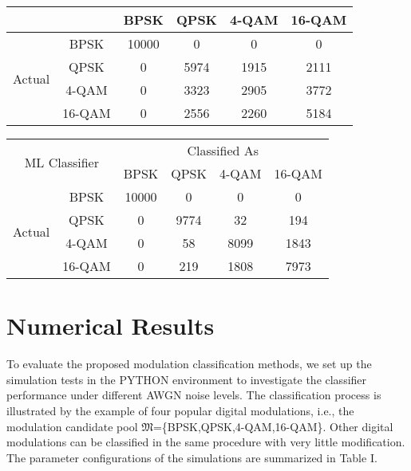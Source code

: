 \documentclass[conference]{IEEEtran}
\begin{document}
\begin{table}[h]
\begin{tabular}{|c|c|c|c|c|c|}
\multicolumn{2}{|c|}{}                                     & BPSK  & QPSK & 4-QAM & 16-QAM \\ \hline
\multirow{4}{*}{Actual}             & BPSK              & 10000 & 0    & 0     & 0      \\ \cline{2-6}
                                       & QPSK              & 0     & 5974 & 1915  & 2111   \\ \cline{2-6}
                                       & 4-QAM             & 0     & 3323 & 2905  & 3772   \\ \cline{2-6}
                                       & 16-QAM            & 0     & 2556 & 2260  & 5184   \\ \hline
\end{tabular}
\vspace{1pt}
\vspace{1pt}

\begin{tabular}{|c|c|c|c|c|c|}
\hline
\multicolumn{2}{|c|}{\multirow{2}{*}{ML Classifier}} & \multicolumn{4}{c|}{Classified As}   \\ \cline{3-6}
\multicolumn{2}{|c|}{}                               & BPSK  & QPSK & 4-QAM & 16-QAM \\ \hline
\multirow{4}{*}{Actual}          & BPSK           & 10000 & 0    & 0     & 0      \\ \cline{2-6}
                                    & QPSK           & 0     & 9774 & 32    & 194    \\ \cline{2-6}
                                    & 4-QAM          & 0     & 58   & 8099  & 1843   \\ \cline{2-6}
                                    & 16-QAM         & 0     & 219  & 1808  & 7973   \\ \hline
\end{tabular}
\end{table}

\section{Numerical Results}
To evaluate the proposed modulation classification methods, we set up the simulation tests in the PYTHON environment to investigate the classifier performance under different AWGN noise levels. The classification process is illustrated by the example of four popular digital modulations, i.e., the modulation candidate pool $\mathfrak{M}$=\{BPSK,QPSK,4-QAM,16-QAM\}. Other digital modulations can be classified in the same procedure with very little modification. The parameter configurations of the simulations are summarized in Table I.
\end{document}
